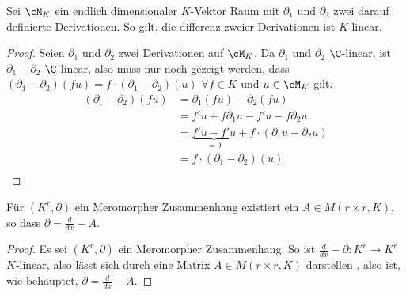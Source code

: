 \begin{lem} Sei $\cM_K$ %
 ein endlich dimensionaler $K$-Vektor Raum mit $\partial_1$ und $\partial_2$
zwei darauf definierte Derivationen. So gilt, die differenz zweier
Derivationen ist $K$-linear.
\end{lem}
\begin{proof}
Seien $\partial_1$ und $\partial_2$ zwei Derivationen auf $\cM_K$.
Da $\partial_1$ und $\partial_2$ $\C$-linear, ist $\partial_1-\partial_2$
$\C$-linear, also muss nur noch gezeigt werden, dass
$(\partial_1-\partial_2)(fu)=f\cdot(\partial_1-\partial_2)(u)$ $\forall f\in
K$ und $u\in\cM_K$ gilt.\\
\begin{align*}
(\partial_1-\partial_2)(fu) &= \partial_1(fu)-\partial_2(fu)\\
&= f'u+f\partial_1u-f'u-f\partial_2u\\
&= \underset{=0}{\underbrace{f'u-f'u}}+f\cdot(\partial_1u-\partial_2u)\\
&= f\cdot(\partial_1-\partial_2)(u)\\
\end{align*}
\end{proof}
\begin{cor}
Für $(K^r,\partial)$ ein Meromorpher Zusammenhang existiert ein $A\in M(r\times
r,K)$, so dass $\partial=\frac{d}{dx}-A$.
\end{cor}
\begin{proof}
Es sei $(K^r,\partial)$ ein Meromorpher Zusammenhang.  So ist
$\frac{d}{dx}-\partial:K^r\rightarrow K^r$ $K$-linear, also lässt sich durch
eine Matrix $A\in M(r\times r,K)$ darstellen
, also ist, wie
behauptet, $\partial=\frac{d}{dx}-A$.
\end{proof}



